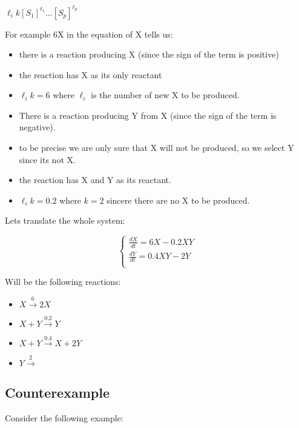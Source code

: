 \begin{center}
    $ \ell_{i} k[S_{1}]^{\ell_{1}} ... [S_{p}]^{\ell_{p}}$
\end{center}

For example 6X in the equation of X tells us:

\begin{itemize}
    \item there is a reaction producing X (since the sign of the term is positive)
    \item the reaction has X as its only reactant
    \item $ \ell_{i} k = 6$ where $\ell_{i}$ is the number of new X to be produced.
\end{itemize}

\begin{itemize}
    \item There is a reaction producing Y from X (since the sign of the term is negative).
    \item to be precise we are only sure that X will not be produced, so we select Y since its not X.
    \item the reaction has X and Y as its reactant.
    \item $\ell_{i} k = 0.2$ where $k = 2$ sincere there are no X to be produced.
\end{itemize}

Lets translate the whole system:

\[
\begin{cases}
        \frac{dX}{dt} = 6 X - 0.2 X Y \\
        \frac{dY}{dt} = 0.4 X Y - 2 Y\\
\end{cases}
\]

Will be the following reactions:

\begin{itemize}
    \item $X \xrightarrow{6} 2 X$
    \item $X + Y \xrightarrow{0.2} Y$
    \item $X + Y \xrightarrow{0.4} X + 2Y$
    \item $Y \xrightarrow{2}$
\end{itemize}

\subsection{Counterexample}
Consider the following example:


